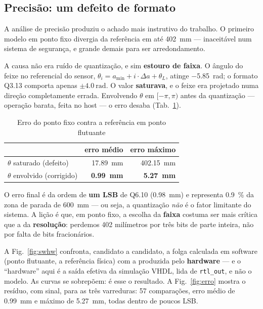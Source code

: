 \documentclass[conference]{IEEEtran}
\begin{document}
\subsection{Precis\~ao: um defeito de formato}
\label{sec:prec}

A an\'alise de precis\~ao produziu o achado mais instrutivo do trabalho. O
primeiro modelo em ponto fixo divergia da refer\^encia em at\'e
\SI{402}{\milli\metre} --- inaceit\'avel num sistema de seguran\c{c}a, e grande
demais para ser arredondamento.

A causa n\~ao era ru\'ido de quantiza\c{c}\~ao, e sim \textbf{estouro de faixa}. O
\^angulo do feixe no referencial do sensor,
$\theta_i = a_{\min} + i\cdot\Delta a + \theta_L$, atinge \SI{-5.85}{\radian}; o
formato Q3.13 comporta apenas $\pm\SI{4.0}{\radian}$. O valor \textbf{saturava}, e
o feixe era projetado numa dire\c{c}\~ao completamente errada. Envolvendo $\theta$
em $[-\pi,\pi)$ antes da quantiza\c{c}\~ao --- opera\c{c}\~ao barata, feita no
host --- o erro desaba (Tab.~\ref{tab:prec}).

\begin{table}[!t]
\caption{Erro do ponto fixo contra a refer\^encia em ponto flutuante}
\label{tab:prec}
\centering\footnotesize
\begin{tabular}{@{}lrr@{}}
\toprule
 & \textbf{erro m\'edio} & \textbf{erro m\'aximo} \\
\midrule
$\theta$ saturado (defeito) & \SI{17.89}{\milli\metre} & \SI{402.15}{\milli\metre} \\
$\theta$ envolvido (corrigido) & \textbf{\SI{0.99}{\milli\metre}} & \textbf{\SI{5.27}{\milli\metre}} \\
\bottomrule
\end{tabular}
\end{table}

O erro final \'e da ordem de \textbf{um LSB} de Q6.10 (\SI{0.98}{\milli\metre}) e
representa \SI{0.9}{\percent} da zona de parada de \SI{600}{\milli\metre} --- ou
seja, a quantiza\c{c}\~ao \emph{n\~ao} \'e o fator limitante do sistema. A
li\c{c}\~ao \'e que, em ponto fixo, a escolha da \textbf{faixa} costuma ser mais
cr\'itica que a da \textbf{resolu\c{c}\~ao}: perdemos \num{402} milímetros por
tr\^es bits de parte inteira, n\~ao por falta de bits fracion\'arios.

A Fig.~\ref{fig:swhw} confronta, candidato a candidato, a folga calculada em
software (ponto flutuante, a refer\^encia f\'isica) com a produzida pelo
\textbf{hardware} --- e o ``hardware'' aqui \'e a sa\'ida efetiva da
simula\c{c}\~ao VHDL, lida de \texttt{rtl\_out}, e n\~ao o modelo. As curvas se
sobrep\~oem: \'e esse o resultado. A Fig.~\ref{fig:erro} mostra o res\'iduo, com
sinal, para as tr\^es varreduras: \num{57} compara\c{c}\~oes, erro m\'edio de
\SI{0.99}{\milli\metre} e m\'aximo de \SI{5.27}{\milli\metre}, todas dentro de
poucos LSB.
\end{document}
